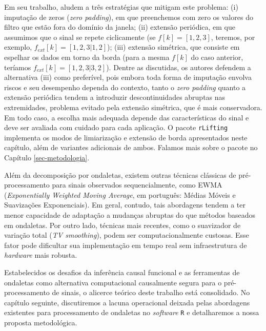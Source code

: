 Em seu trabalho,  aludem a três estratégias que mitigam este problema: (i) imputação de zeros (\emph{zero padding}), em que preenchemos com zero os valores do filtro que estão fora do domínio da janela; (ii) extensão periódica, em que assumimos que o sinal se repete ciclicamente (se \(f[k] = [1, 2, 3]\), teremos, por exemplo, \(f_{ext}[k] = [1, 2, 3 | 1, 2]\)); (iii) extensão simétrica, que consiste em espelhar os dados em torno da borda (para a mesma \(f[k]\) do caso anterior, teríamos \(f_{ext}[k] = [1, 2, 3 | 3, 2]\)). 
Dentre as discutidas, os autores defendem a alternativa (iii) como preferível, pois embora toda forma de imputação envolva riscos e seu desempenho dependa do contexto, tanto o \emph{zero padding} quanto a extensão periódica tendem a introduzir descontinuidades abruptas nas extremidades, problema evitado pela extensão simétrica, que é mais conservadora.
Em todo caso, a escolha mais adequada depende das características do sinal e deve ser avaliada com cuidado para cada aplicação. 
O pacote \texttt{rLifting} \cite{dasilvaRLiftingHighPerformanceWavelet2026} implementa os modos de limiarização e extensão de borda apresentados neste capítulo, além de variantes adicionais de ambos. 
Falamos mais sobre o pacote no Capítulo \ref{sec-metodologia}.

Além da decomposição por ondaletas, existem outras técnicas clássicas de pré-processamento para sinais observados sequencialmente, como EWMA (\emph{Exponentially Weighted Moving Average}, em português: Médias Móveis e Suavizações Exponenciais). 
Em geral, contudo, tais abordagens tendem a ter menor capacidade de adaptação a mudanças abruptas do que métodos baseados em ondaletas. 
Por outro lado, técnicas mais recentes, como o suavizador de variação total (\emph{TV smoothing}), podem ser computacionalmente custosas. 
Esse fator pode dificultar sua implementação em tempo real sem infraestrutura de \emph{hardware} mais robusta. 

Estabelecidos os desafios da inferência causal funcional e as ferramentas de ondaletas como alternativa computacional causalmente segura para o pré-processamento de sinais, o alicerce teórico deste trabalho está consolidado. 
No capítulo seguinte, discutiremos a lacuna operacional deixada pelas abordagens existentes para processamento de ondaletas no \emph{software} \texttt{R} e detalharemos a nossa proposta metodológica.